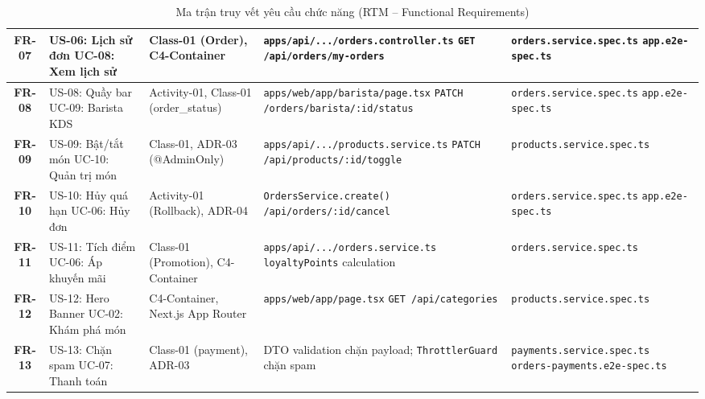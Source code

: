 \documentclass[11pt,a4paper]{article}
\begin{document}
\begin{table}[H]
\begin{tabularx}{\linewidth}{|c|p{2.6cm}|p{2.4cm}|p{3.4cm}|Y|}
\textbf{FR-07} & US-06: Lịch sử đơn \newline UC-08: Xem lịch sử & Class-01 (Order), C4-Container & \texttt{apps/api/.../orders.controller.ts} \newline \texttt{GET /api/orders/my-orders} & \texttt{orders.service.spec.ts} \newline \texttt{app.e2e-spec.ts} \\ \hline
\textbf{FR-08} & US-08: Quầy bar \newline UC-09: Barista KDS & Activity-01, Class-01 (order\_status) & \texttt{apps/web/app/barista/page.tsx} \newline \texttt{PATCH /orders/barista/:id/status} & \texttt{orders.service.spec.ts} \newline \texttt{app.e2e-spec.ts} \\ \hline
\textbf{FR-09} & US-09: Bật/tắt món \newline UC-10: Quản trị món & Class-01, ADR-03 (@AdminOnly) & \texttt{apps/api/.../products.service.ts} \newline \texttt{PATCH /api/products/:id/toggle} & \texttt{products.service.spec.ts} \\ \hline
\textbf{FR-10} & US-10: Hủy quá hạn \newline UC-06: Hủy đơn & Activity-01 (Rollback), ADR-04 & \texttt{OrdersService.create()} \newline \texttt{/api/orders/:id/cancel} & \texttt{orders.service.spec.ts} \newline \texttt{app.e2e-spec.ts} \\ \hline
\textbf{FR-11} & US-11: Tích điểm \newline UC-06: Áp khuyến mãi & Class-01 (Promotion), C4-Container & \texttt{apps/api/.../orders.service.ts} \newline \texttt{loyaltyPoints} calculation & \texttt{orders.service.spec.ts} \\ \hline
\textbf{FR-12} & US-12: Hero Banner \newline UC-02: Khám phá món & C4-Container, Next.js App Router & \texttt{apps/web/app/page.tsx} \newline \texttt{GET /api/categories} & \texttt{products.service.spec.ts} \\ \hline
\textbf{FR-13} & US-13: Chặn spam \newline UC-07: Thanh toán & Class-01 (payment), ADR-03 & DTO validation chặn payload; \texttt{ThrottlerGuard} chặn spam & \texttt{payments.service.spec.ts} \newline \texttt{orders-payments.e2e-spec.ts} \\ \hline
\end{tabularx}
\caption{Ma trận truy vết yêu cầu chức năng (RTM -- Functional Requirements)}
\label{tab:rtm_fr}
\end{table}
\clearpage
\end{document}
